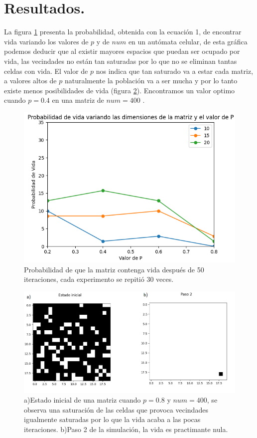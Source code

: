 \documentclass{article}
\begin{document}
\section{Resultados.}
La figura \ref{prob} presenta la probabilidad, obtenida con la ecuación 1, de encontrar vida variando los valores de $p$ y de $num$ en un autómata celular, de esta gráfica podemos deducir que al existir mayores espacios que puedan ser ocupado por vida, las vecindades no están tan saturadas por lo que no se eliminan tantas celdas con vida. El valor de $p$ nos indica que tan saturado va a estar cada matriz, a valores altos de $p$ naturalmente la población va a ser mucha y por lo tanto existe menos posibilidades de vida (figura \ref{p0.8}). Encontramos un valor optimo cuando $p=0.4$ en una matriz de $num=400$ .
\begin{figure} 
    \centering
    \includegraphics[width=140mm]{prob.png} 
    \caption{Probabilidad de que la matriz contenga vida después de 50 iteraciones, cada experimento se repitió 30 veces.}
    \label{prob}
\end{figure}
\begin{figure} 
    \centering
    \includegraphics[width=140mm]{p0.4.png} 
    \caption{a)Estado inicial de una matriz cuando $p=0.8$ y $num=400$, se observa una saturación de las celdas que provoca vecindades igualmente saturadas por lo que la vida acaba a las pocas iteraciones. b)Paso 2 de la simulación, la vida es practimante nula.}
    \label{p0.8}
\end{figure}
\end{document}
